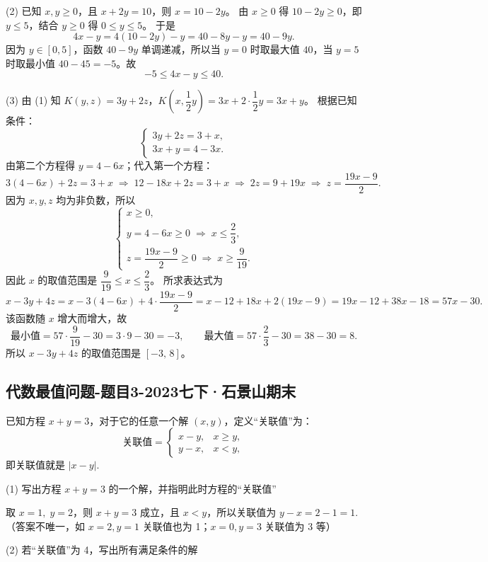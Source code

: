 (2) 已知 \(x,y\geq 0\)，且 \(x+2y=10\)，则 \(x=10-2y\)。
由 \(x\geq 0\) 得 \(10-2y\geq 0\)，即 \(y\leq 5\)，结合 \(y\geq 0\) 得 \(0\leq y\leq 5\)。
于是
\[
4x-y = 4(10-2y)-y = 40-8y-y = 40-9y.
\]
因为 \(y\in[0,5]\)，函数 \(40-9y\) 单调递减，所以当 \(y=0\) 时取最大值 \(40\)，当 \(y=5\) 时取最小值 \(40-45=-5\)。故
\[
-5 \leq 4x-y \leq 40.
\]

(3) 由 (1) 知 \(K(y,z)=3y+2z\)，\(K\!\left(x,\dfrac{1}{2}y\right)=3x+2\cdot\dfrac{1}{2}y=3x+y\)。
根据已知条件：
\[
\begin{cases}
3y+2z = 3+x,\\[2mm]
3x+y = 4-3x.
\end{cases}
\]
由第二个方程得 \(y=4-6x\)；代入第一个方程：
\[
3(4-6x)+2z = 3+x \;\Longrightarrow\; 12-18x+2z = 3+x \;\Longrightarrow\; 2z = 9+19x \;\Longrightarrow\; z = \frac{19x-9}{2}.
\]
因为 \(x,y,z\) 均为非负数，所以
\[
\begin{cases}
x \geq 0,\\
y = 4-6x \geq 0 \;\Longrightarrow\; x \leq \dfrac{2}{3},\\
z = \dfrac{19x-9}{2} \geq 0 \;\Longrightarrow\; x \geq \dfrac{9}{19}.
\end{cases}
\]
因此 \(x\) 的取值范围是 \(\dfrac{9}{19}\leq x \leq \dfrac{2}{3}\)。
所求表达式为
\[
x-3y+4z = x-3(4-6x)+4\cdot\frac{19x-9}{2}
= x-12+18x+2(19x-9)
= 19x-12+38x-18 = 57x-30.
\]
该函数随 \(x\) 增大而增大，故
\[
\text{最小值}=57\cdot\frac{9}{19}-30 = 3\cdot9-30 = -3,\qquad
\text{最大值}=57\cdot\frac{2}{3}-30 = 38-30 = 8.
\]
所以 \(x-3y+4z\) 的取值范围是 \([-3,\,8]\)。


\subsection{代数最值问题-题目3-2023七下·石景山期末}

\label{代数最值问题-题目3-2023七下·石景山期末}  

已知方程 \(x+y=3\)，对于它的任意一个解 \((x,y)\)，定义“关联值”为：
\[
\text{关联值}=
\begin{cases}
x-y, & x\ge y,\\
y-x, & x<y,
\end{cases}
\]
即关联值就是 \(|x-y|\).

(1) 写出方程 \(x+y=3\) 的一个解，并指明此时方程的“关联值”

取 \(x=1,\;y=2\)，则 \(x+y=3\) 成立，且 \(x<y\)，所以关联值为 \(y-x=2-1=1\).
（答案不唯一，如 \(x=2,y=1\) 关联值也为 1；\(x=0,y=3\) 关联值为 3 等）

(2) 若“关联值”为 4，写出所有满足条件的解

